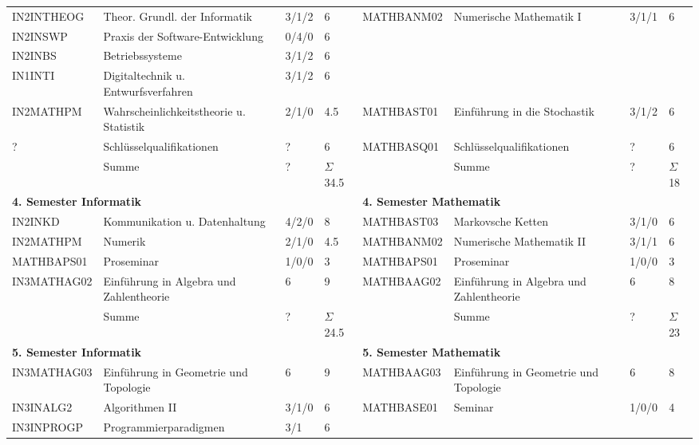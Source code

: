 \documentclass[a4paper,landscape]{scrartcl}
\begin{document}
\begin{savenotes}
\begin{tabular}{llll || llll}
 IN2INTHEOG & Theor. Grundl. der Informatik & 3/1/2 & 6 & MATHBANM02 & Numerische Mathematik I      & 3/1/1 & 6 \\
 IN2INSWP   & Praxis der Software-Entwicklung& 0/4/0 & 6 \\
 IN2INBS    & Betriebssysteme               & 3/1/2 & 6 \\
 IN1INTI    & Digitaltechnik u. Entwurfsverfahren & 3/1/2 & 6 \\
 IN2MATHPM  & Wahrscheinlichkeitstheorie u. Statistik & 2/1/0 & 4.5  & MATHBAST01  & Einführung in die Stochastik & 3/1/2 & 6  \\
\rowcolor{LightGreen}
  ?         & Schlüsselqualifikationen      & ?     & 6 & MATHBASQ01    & Schlüsselqualifikationen  & ? & 6  \\
            & Summe                         &? &$\Sigma$ 34.5 &   & Summe                           & ? & $\Sigma$ 18 \\
\multicolumn{4}{l}{\cellcolor{blue!25} \bfseries{4. Semester Informatik}} & \multicolumn{4}{l}{\cellcolor{blue!25} \bfseries{4. Semester Mathematik}}\\
 IN2INKD    & Kommunikation u. Datenhaltung & 4/2/0 & 8 & MATHBAST03 & Markovsche Ketten             & 3/1/0 & 6\\
 IN2MATHPM  & Numerik                       & 2/1/0 & 4.5 & MATHBANM02 & Numerische Mathematik II      & 3/1/1 & 6\\
\rowcolor{LightGreen}
 MATHBAPS01 & Proseminar                    & 1/0/0 & 3 &  MATHBAPS01 & Proseminar                    & 1/0/0 & 3 \\
\rowcolor{LightGreen}
 IN3MATHAG02& Einführung in Algebra und Zahlentheorie & 6 & 9 & MATHBAAG02 & Einführung in Algebra und Zahlentheorie & 6 & 8\\
            & Summe                         &? &$\Sigma$ 24.5 &   & Summe                           & ? & $\Sigma$ 23 \\
\multicolumn{4}{l}{\cellcolor{blue!25} \bfseries{5. Semester Informatik}} & \multicolumn{4}{l}{\cellcolor{blue!25} \bfseries{5. Semester Mathematik}}\\
\rowcolor{LightGreen}
 IN3MATHAG03& Einführung in Geometrie und Topologie & 6 & 9 & MATHBAAG03 & Einführung in Geometrie und Topologie & 6 & 8\\
 IN3INALG2  & Algorithmen II                & 3/1/0 & 6 & MATHBASE01    & Seminar                       & 1/0/0 &  4\\
 IN3INPROGP & Programmierparadigmen         & 3/1   & 6 \\

\end{tabular}
\end{savenotes}
\end{document}
